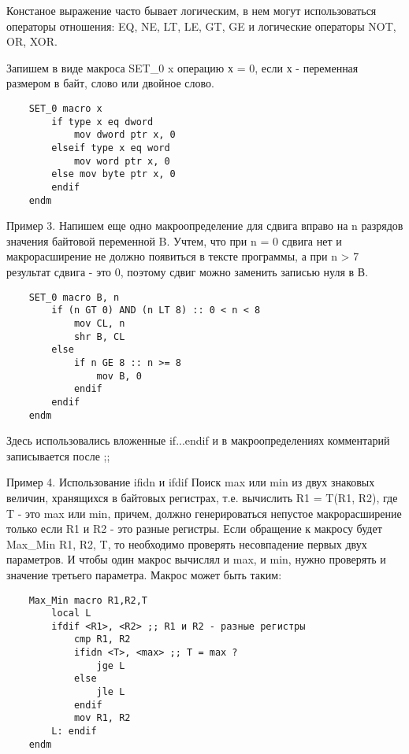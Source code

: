 Констаное выражение часто бывает логическим, в нем могут использоваться операторы отношения: EQ, NE, LT, LE, GT, GE и логические операторы NOT, OR, XOR.

Запишем в виде макроса SET_0 x операцию х = 0, если х - переменная размером в байт, слово или двойное слово.
\begin{verbatim}
    SET_0 macro x
        if type x eq dword
            mov dword ptr x, 0
        elseif type x eq word
            mov word ptr x, 0
        else mov byte ptr x, 0
        endif
    endm
\end{verbatim}

Пример 3. Напишем еще одно макроопределение для сдвига вправо на n разрядов значения байтовой переменной B. Учтем, что при n = 0 сдвига нет и макрорасширение не должно появиться в тексте программы, а при n > 7 результат сдвига - это 0, поэтому сдвиг можно заменить записью нуля в В.
\begin{verbatim}
    SET_0 macro B, n
        if (n GT 0) AND (n LT 8) :: 0 < n < 8
            mov CL, n
            shr B, CL
        else
            if n GE 8 :: n >= 8
                mov B, 0
            endif
        endif
    endm
\end{verbatim}
Здесь использовались вложенные if...endif и в макроопределениях комментарий записывается после ;;

Пример 4. Использование ifidn и ifdif
Поиск max или min из двух знаковых величин, хранящихся в байтовых регистрах, т.е. вычислить R1 = T(R1, R2),
где T - это max или min, причем, должно генерироваться непустое макрорасширение только если R1 и R2 - это разные регистры. Если обращение к макросу будет Max_Min R1, R2, T, то необходимо проверять несовпадение первых двух параметров. И чтобы один макрос вычислял и max, и min, нужно проверять и значение третьего параметра. Макрос может быть таким:
\begin{verbatim}
    Max_Min macro R1,R2,T
        local L
        ifdif <R1>, <R2> ;; R1 и R2 - разные регистры
            cmp R1, R2
            ifidn <T>, <max> ;; T = max ?
                jge L
            else
                jle L
            endif
            mov R1, R2
        L: endif
    endm
\end{verbatim}


